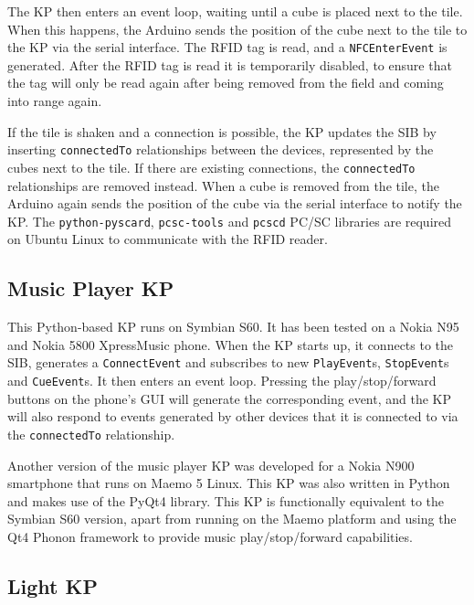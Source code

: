 The \ac{KP} then enters an event loop, waiting until a cube is placed next to the tile. When this happens, the Arduino sends the position of the cube next to the tile to the \ac{KP} via the serial interface. The \ac{RFID} tag is read, and a \texttt{NFCEnterEvent} is generated. After the \ac{RFID} tag is read it is temporarily disabled, to ensure that the tag will only be read again after being removed from the field and coming into range again.

If the tile is shaken and a connection is possible, the \ac{KP} updates the \ac{SIB} by inserting \texttt{connectedTo} relationships between the devices, represented by the cubes next to the tile. If there are existing connections, the \texttt{connectedTo} relationships are removed instead. When a cube is removed from the tile, the Arduino again sends the position of the cube via the serial interface to notify the \ac{KP}. The \texttt{python-pyscard}, \texttt{pcsc-tools} and \texttt{pcscd} \ac{PC/SC} libraries are required on Ubuntu Linux to communicate with the \ac{RFID} reader.

\subsection{Music Player KP}
\label{MusicPlayerKP}
This Python-based \ac{KP} runs on Symbian S60. It has been tested on a Nokia N95 and Nokia 5800 XpressMusic phone. When the \ac{KP} starts up, it connects to the \ac{SIB}, generates a \texttt{ConnectEvent} and subscribes to new \texttt{PlayEvent}s, \texttt{StopEvent}s and \texttt{CueEvent}s. It then enters an event loop. Pressing the play/stop/forward buttons on the phone's \ac{GUI} will generate the corresponding event, and the \ac{KP} will also respond to events generated by other devices that it is connected to via the \texttt{connectedTo} relationship.

Another version of the music player \ac{KP} was developed for a Nokia N900 smartphone that runs on Maemo 5 Linux. This \ac{KP} was also written in Python and makes use of the PyQt4 library. This \ac{KP} is functionally equivalent to the Symbian S60 version, apart from running on the Maemo platform and using the Qt4 Phonon framework to provide music play/stop/forward capabilities.

\subsection{Light KP}

